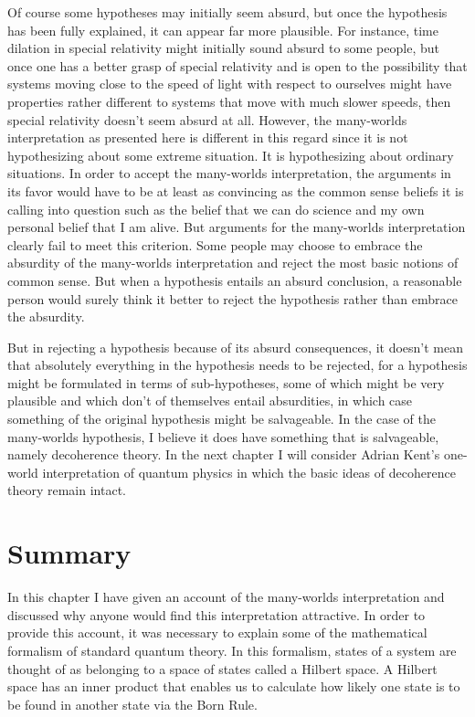 \documentclass[12pt]{report}
\begin{document}
        Of course some hypotheses may initially seem absurd, but once the hypothesis has been fully explained, it can appear far more plausible. For instance, time dilation in special relativity might initially sound absurd to some people, but once one has a better grasp of special relativity and is open to the possibility that  systems moving close to the speed of light with respect to ourselves might have properties rather different to systems that move with much slower speeds, then special relativity doesn't seem absurd at all. However, the many-worlds interpretation as presented here is different in this regard since it is not hypothesizing about some extreme situation. It is hypothesizing about ordinary situations. In order to accept the many-worlds interpretation, the arguments in its favor would have to be at least as convincing as the common sense beliefs it is calling into question such as the belief that we can do science and my own personal belief that I am alive. But arguments for the many-worlds interpretation clearly fail to meet this criterion. Some people may choose to embrace the absurdity of the many-worlds interpretation and reject the most basic notions of common sense. But when a hypothesis entails an absurd conclusion, a reasonable person would surely think it better to reject the hypothesis rather than embrace the absurdity. 

        But in rejecting a hypothesis because of its absurd consequences, it doesn't mean that absolutely everything in the hypothesis needs to be rejected, for  a hypothesis might be formulated in terms of sub-hypotheses, some of which might be very plausible and which don't of themselves entail absurdities, in which case something of the original hypothesis might be salvageable. In the case of the many-worlds hypothesis, I believe it does have something that is salvageable, namely decoherence theory. In the next chapter I will consider Adrian Kent's one-world interpretation of quantum physics in which the basic ideas of decoherence theory remain intact.

       

\section{Summary}\label{manyworldssummary}
In this chapter I have given an account of the many-worlds interpretation and discussed why anyone would find this interpretation attractive. In order to provide this account, it was necessary to explain some of the mathematical formalism of standard quantum theory. In this formalism, states of a system are thought of as belonging to a space of states called a Hilbert space. A Hilbert space has an inner product that enables us to calculate how likely one state is to be found in another state via the Born Rule. 
\end{document}
